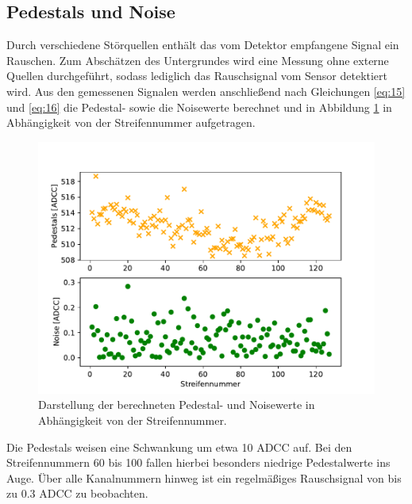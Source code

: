 \subsection{Pedestals und Noise}
\label{kap:Pedestal}
Durch verschiedene Störquellen enthält das vom Detektor empfangene Signal ein Rauschen. Zum Abschätzen des Untergrundes wird eine Messung ohne externe Quellen durchgeführt, sodass lediglich das Rauschsignal vom Sensor detektiert wird. Aus den gemessenen Signalen werden anschließend nach Gleichungen \eqref{eq:15} und \eqref{eq:16} die Pedestal- sowie die Noisewerte berechnet und in Abbildung \ref{fig:Pedestals} in Abhängigkeit von der Streifennummer aufgetragen.
\begin{figure}
  \centering
  \includegraphics[width=\textwidth]{plots/Pedestals_Noise.pdf}
  \caption{Darstellung der berechneten Pedestal- und Noisewerte in Abhängigkeit von der Streifennummer.}
  \label{fig:Pedestals}
\end{figure}
\FloatBarrier
Die Pedestals weisen eine Schwankung um etwa 10 ADCC auf. Bei den Streifennummern 60 bis 100 fallen hierbei besonders niedrige Pedestalwerte ins Auge.
Über alle Kanalnummern hinweg ist ein regelmäßiges Rauschsignal von bis zu 0.3 ADCC zu beobachten.

